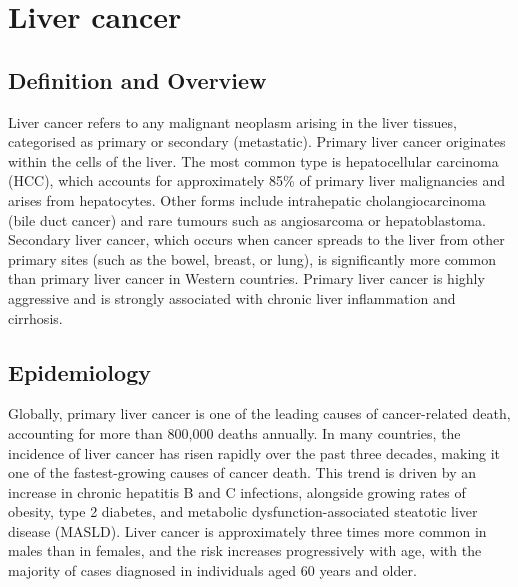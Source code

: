 \chapter{Liver cancer}

\section*{Definition and Overview}
Liver cancer refers to any malignant neoplasm arising in the liver tissues, categorised as primary or secondary (metastatic). Primary liver cancer originates within the cells of the liver. The most common type is hepatocellular carcinoma (HCC), which accounts for approximately 85\% of primary liver malignancies and arises from hepatocytes. Other forms include intrahepatic cholangiocarcinoma (bile duct cancer) and rare tumours such as angiosarcoma or hepatoblastoma. Secondary liver cancer, which occurs when cancer spreads to the liver from other primary sites (such as the bowel, breast, or lung), is significantly more common than primary liver cancer in Western countries. Primary liver cancer is highly aggressive and is strongly associated with chronic liver inflammation and cirrhosis.

\section*{Epidemiology}
Globally, primary liver cancer is one of the leading causes of cancer-related death, accounting for more than 800,000 deaths annually. In many countries, the incidence of liver cancer has risen rapidly over the past three decades, making it one of the fastest-growing causes of cancer death. This trend is driven by an increase in chronic hepatitis B and C infections, alongside growing rates of obesity, type 2 diabetes, and metabolic dysfunction-associated steatotic liver disease (MASLD). Liver cancer is approximately three times more common in males than in females, and the risk increases progressively with age, with the majority of cases diagnosed in individuals aged 60 years and older.

